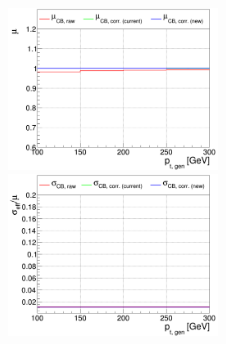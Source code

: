 \begin{figure}
\includegraphics[width=0.495\textwidth]{./plots_pdf/ECAL_plots/plotsNOPU/EB/FULL/pdf/GENPT/EBFULL_GENPT_0100_0300_MuOverBins.pdf}
\includegraphics[width=0.495\textwidth]{./plots_pdf/ECAL_plots/plotsNOPU/EB/FULL/pdf/GENPT/EBFULL_GENPT_0100_0300_EffSigmaOverBins.pdf}

\caption [NoPU EB Full Readout (top) low \pt, (middle) mid \pt, (bottom) high \pt]{}
\label{fig:NOPU_EBFULL_pt}
\end{figure}




